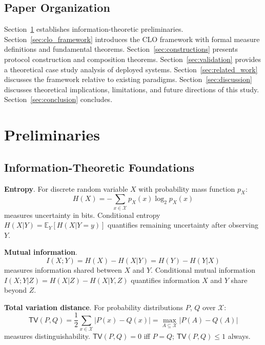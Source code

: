 \documentclass{ieeeaccess}
\begin{document}
\subsection{Paper Organization}

Section~\ref{sec:preliminaries} establishes information-theoretic preliminaries. Section~\ref{sec:clo_framework} introduces the CLO framework with formal measure definitions and fundamental theorems. Section~\ref{sec:constructions} presents protocol construction and composition theorems. Section~\ref{sec:validation} provides a theoretical case study analysis of deployed systems. Section~\ref{sec:related_work} discusses the framework relative to existing paradigms. Section~\ref{sec:discussion} discusses theoretical implications, limitations, and future directions of this study. Section~\ref{sec:conclusion} concludes.
\section{Preliminaries}\label{sec:preliminaries}

\subsection{Information-Theoretic Foundations}

\textbf{Entropy}. For discrete random variable $X$ with probability mass function $p_X$:
\begin{equation}
H(X) = -\sum_{x \in \mathcal{X}} p_X(x) \log_2 p_X(x)
\end{equation}
measures uncertainty in bits. Conditional entropy $H(X|Y) = \mathbb{E}_Y[H(X|Y=y)]$ quantifies remaining uncertainty after observing $Y$.

\textbf{Mutual information}.
\begin{equation}
I(X;Y) = H(X) - H(X|Y) = H(Y) - H(Y|X)
\end{equation}
measures information shared between $X$ and $Y$. Conditional mutual information $I(X;Y|Z) = H(X|Z) - H(X|Y,Z)$ quantifies information $X$ and $Y$ share beyond $Z$.

\textbf{Total variation distance}. For probability distributions $P$, $Q$ over $\mathcal{X}$:
\begin{equation}
\mathsf{TV}(P,Q) = \frac{1}{2}\sum_{x \in \mathcal{X}} |P(x) - Q(x)| = \max_{A \subseteq \mathcal{X}} |P(A) - Q(A)|
\end{equation}
measures distinguishability. $\mathsf{TV}(P,Q) = 0$ iff $P = Q$; $\mathsf{TV}(P,Q) \leq 1$ always.
\end{document}
